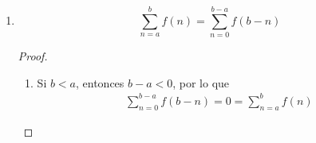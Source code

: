 \begin{enumerate}[label=\alph*)]
  \textbf{Nota:} En esta proposición se restringe que $s\leq j\leq t$, pues la proposición no es válida para todo $s\geq j\geq t$:
  \begin{enumerate}[label=\Roman*)]
  \item Si $s>j>t$,
  \begin{align*}
    \sum_{n=s}^{t} f(n) = 0 = \sum_{n=s}^{j} f(n) + \sum_{n=j+1}^{t} f(n)
  \end{align*}

  \item Si $s>j=t$,
  \begin{align*}
    \sum_{n=s}^{t} f(n)= 0 = \sum_{n=s}^{j} f(n) + \sum_{n=j+1}^{t}
  \end{align*}

  \item Si $s=j>t$,
  \begin{enumerate}[label=\roman*)]
    \item $\sum_{n=s}^{j} f(n) + \sum_{n=j+1}^{t} f(n) = f(n) + 0 = f(n)$.
    \item $\sum_{n=s}^{t} f(n) = 0$.
    
    El lector notará que para partir la suma en este caso, debe cumplirse que $f(n)=0$, pero esto dependerá de cada función y de los íncides, por lo que en general, $f(n)\neq 0$, por ejemplo para cualquier sumatoria $\sum_{n=a}^{b} c$, donde $c\neq 0$.

  \end{enumerate}

   \[\sum_{n=a}^{b}f(n) = \sum_{n=0}^{b} f(n) - \sum_{n=0}^{a-1} f(n)\]
  \begin{proof}\leavevmode
    \begin{align*}
      \sum_{n=0}^{b} f(n) - \sum_{n=0}^{a-1} f(n) &= \sum_{n=0}^{a} f(n) + \sum_{a+1}^{b} f(n) - \sum_{n=0}^{a-1}f(n) && \text{Partir la suma}\\
      &= \sum_{n=0}^{a-1} f(n) + \sum_{n=a}^{a} f(n) + \sum_{a+1}^{b} f(n) - \sum_{n=0}^{a-1}f(n) && \text{Partir la suma}\\
      &= \sum_{n=a}^{a} f(n) + \sum_{a+1}^{b} f(n)\\
      &= \sum_{n=a}^{b}f(n)
    \end{align*}
  \end{proof}

  \end{enumerate}

  \item \[\sum_{n=a}^{b}f(n) = \sum_{n=0}^{b-a} f(b-n)\]
  \begin{proof}\leavevmode
    \begin{enumerate}[label=\Roman*)]
    \item Si $b<a$, entonces $b-a<0$, por lo que
    \begin{align*}
      \sum_{n=0}^{b-a} f(b-n) = 0 = \sum_{n=a}^{b}f(n)
    \end{align*}
    

\end{enumerate}
\end{proof}
\end{enumerate}
